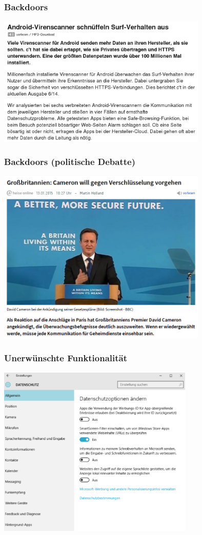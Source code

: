 \documentclass[12pt, xcolor={svgnames,table}]{beamer}
\begin{document}
\begin{frame}
  \frametitle{Backdoors}
  \begin{center}
    \includegraphics[width=10cm]{img/backdoor-av}
  \par\end{center}
\end{frame}

\begin{frame}
  \frametitle{Backdoors (politische Debatte)}
  \begin{center}
    \includegraphics[width=10cm]{img/backdoor_gb.png}
  \par\end{center}
\end{frame}

\begin{frame}
    \frametitle{Unerwünschte Funktionalität}
    \begin{center}
      \includegraphics[width=0.7\textwidth]{img/windows10.png}
    \end{center}
\end{frame}
\end{document}
